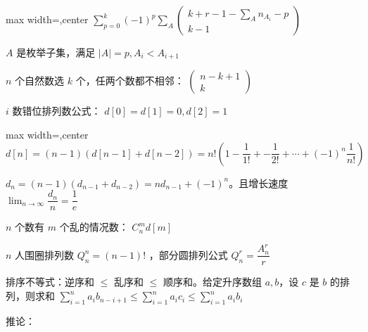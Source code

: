 \documentclass[twocolumn,10pt]{ctexart}
\begin{document}
\begin{adjustbox}{max width=\linewidth,center}
$\sum_{p=0}^k(-1)^p\sum_{A}
\begin{pmatrix}
k+r-1-\sum_An_{A_i}-p\\k-1
\end{pmatrix}$
\end{adjustbox}

$A$ 是枚举子集，满足 $|A|=p,A_i < A_{i+1}$

$n$ 个自然数选 $k$ 个，任两个数都不相邻： $\begin{pmatrix}n-k+1\\k\end{pmatrix}$

$i$ 数错位排列数公式： $d[0]=d[1]=0,d[2]=1$

\begin{adjustbox}{max width=\linewidth,center}
$d[n]=(n-1)(d[n-1]+d[n-2])=n!(1-\dfrac{1}{1!}+-\dfrac{1}{2!}+\cdots+(-1)^n\dfrac1{n!})$
\end{adjustbox}

$d_n=(n-1)(d_{n-1}+d_{n-2})=nd_{n-1}+(-1)^n$。且增长速度 $\lim_{n\to\infty}\dfrac{d_n}{n}=\dfrac1e$

$n$ 个数有 $m$ 个乱的情况数： $C_n^md[m]$

$n$ 人围圈排列数 $Q_n^n=(n-1)!$ ，部分圆排列公式 $Q_n^r=\dfrac{A_n^r}r$

排序不等式：逆序和 $\le$ 乱序和 $\le$ 顺序和。给定升序数组 $a,b$，设 $c$ 是 $b$ 的排列，则求和 $\sum_{i=1}^na_ib_{n-i+1}\le \sum_{i=1}^na_ic_i\le \sum_{i=1}^na_ib_i$

推论：
\end{document}

